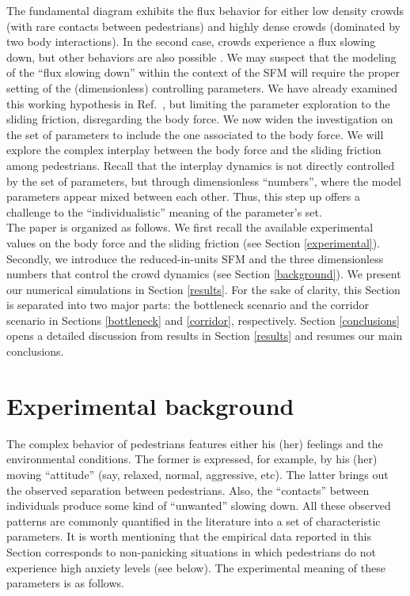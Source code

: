\documentclass[preprint,12pt]{elsarticle}
\begin{document}
The fundamental diagram exhibits the flux behavior for either low density crowds
(with rare contacts between pedestrians) and highly dense crowds (dominated  by
two body interactions). In the second case, crowds experience a flux  slowing
down, but other behaviors are also possible \cite{helbing_2007,lohner_2018}.
We may suspect that the  modeling of the  ``flux slowing down'' within the
context of the SFM will require the proper  setting of the (dimensionless)
controlling parameters. We have already examined this working hypothesis in
Ref.~\cite{dorso_2019}, but limiting the parameter exploration to  the sliding
friction, disregarding the body force.  We now widen the investigation on the
set of parameters to include the one  associated to the body force. We will
explore   the complex interplay between  the body force and the sliding friction
among pedestrians. Recall that the  interplay dynamics is not directly
controlled by the set of parameters, but  through dimensionless ``numbers'',
where the model parameters appear mixed  between each other. Thus, this step up
offers a challenge to the  ``individualistic'' meaning of the parameter's set.
\\


The paper is organized as follows. We first recall the available  experimental
values on the body force and the sliding friction (see Section
\ref{experimental}). Secondly, we introduce the reduced-in-units SFM and the
three dimensionless numbers that control the crowd dynamics (see Section
\ref{background}). We present our numerical simulations in Section
\ref{results}. For the sake of clarity, this Section is  separated into two
major parts: the bottleneck scenario and the corridor  scenario in Sections
\ref{bottleneck} and \ref{corridor}, respectively.  Section \ref{conclusions}
opens a detailed discussion from results in Section \ref{results} and resumes
our main conclusions.

\section{\label{experimental}Experimental background}

The complex behavior of pedestrians features  either his (her) feelings and  the
environmental conditions. The former is expressed, for example, by his  (her)
moving ``attitude'' (say, relaxed, normal, aggressive, etc). The latter brings
out the  observed separation between pedestrians. Also, the ``contacts'' between
individuals produce some kind of ``unwanted'' slowing down. All these  observed
patterns are commonly quantified in the literature into a set of  characteristic
parameters. It is worth mentioning that the empirical data reported in this
Section corresponds to non-panicking situations in which pedestrians  do not
experience high anxiety levels (see below).  The experimental meaning of these
parameters is as follows.
\end{document}

